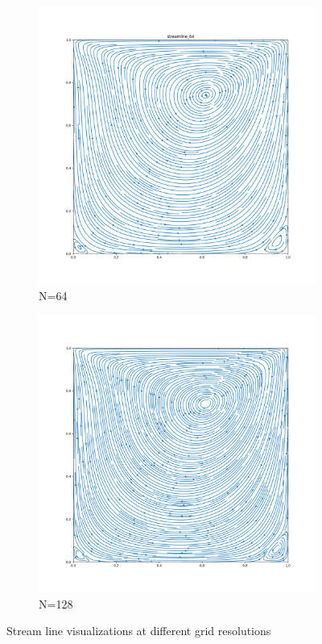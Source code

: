 \documentclass[12pt]{article}
\begin{document}
\begin{figure}[H]
    \begin{subfigure}[b]{0.48\linewidth}
        \includegraphics[width=\linewidth]{figures/Re=100_result/streamline_64.png}
        \caption{N=64}
    \end{subfigure}
    \hspace{-5mm} %
    \begin{subfigure}[b]{0.48\linewidth}
        \includegraphics[width=\linewidth]{figures/Re=100_result/streamline_128.png}
        \caption{N=128}
    \end{subfigure}
    \caption{Stream line visualizations at different grid resolutions}
\end{figure}
\end{document}

